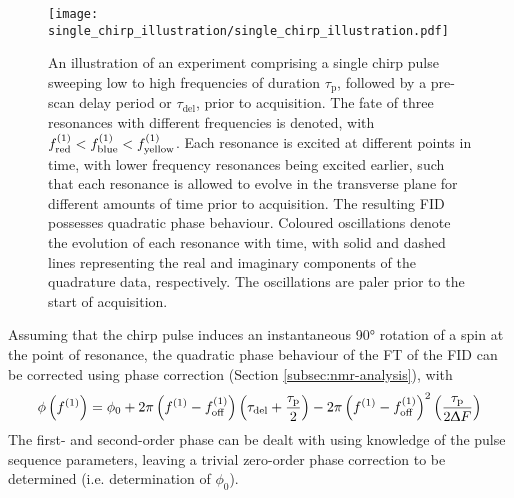 \begin{figure}
    \centering
    \texttt{[image: single\_chirp\_illustration/single\_chirp\_illustration.pdf]}
    \caption{
        An illustration of an experiment comprising a single chirp pulse sweeping
        low to high frequencies of duration $\tau_{\text{p}}$, followed by
        a pre-scan delay period or $\tau_{\text{del}}$, prior to
        acquisition. The fate of three resonances with different frequencies is
        denoted, with $f^{(1)}_{\text{red}} < f^{(1)}_{\text{blue}} <
        f^{(1)}_{\text{yellow}}$. Each resonance is excited at different points
        in time, with lower frequency resonances being excited earlier, such that
        each resonance is allowed to evolve in the transverse plane for
        different amounts of time prior to acquisition.
        The resulting \ac{FID} possesses quadratic phase behaviour.
        Coloured oscillations denote the evolution of each resonance with time,
        with solid and dashed lines representing the real and imaginary
        components of the quadrature data, respectively. The oscillations are
        paler prior to the start of acquisition.
    }
    \label{fig:single-chirp}
\end{figure}

Assuming that the chirp pulse induces an instantaneous \ang{90} rotation of a
spin at the point of resonance, the quadratic phase behaviour of the \ac{FT} of
the \ac{FID} can be corrected using phase correction (Section
\ref{subsec:nmr-analysis}), with
\begin{equation}
    \phi \left( f^{(1)} \right) = \phi_0 + 2 \pi \left(f^{(1)} - f_{\mathrm{off}}^{(1)}\right) \left(\tau_{\text{del}}
    + \frac{\tau_{\text{p}}}{2} \right) -
    2 \pi \left(f^{(1)} - f_{\mathrm{off}}^{(1)}\right)^2 \left( \frac{\tau_{\text{p}}}{2
    \Updelta F} \right)
    \label{eq:quadratic-phase}
\end{equation}
The first- and second-order phase can be dealt with using knowledge of the
pulse sequence parameters, leaving a trivial zero-order phase correction to be
determined (i.e. determination of $\phi_0$).


